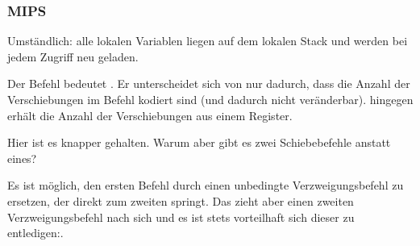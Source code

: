 \subsubsection{MIPS}




Umständlich: alle lokalen Variablen liegen auf dem lokalen Stack und werden bei
jedem Zugriff neu geladen.

Der Befehl \SLLV bedeutet . Er unterscheidet
sich von \SLL nur dadurch, dass die Anzahl der Verschiebungen im \SLL Befehl
kodiert sind (und dadurch nicht veränderbar). \SLLV hingegen erhält die Anzahl
der Verschiebungen aus einem Register.

Hier ist es knapper gehalten.
Warum aber gibt es zwei Schiebebefehle anstatt eines?

Es ist möglich, den ersten \SLLV Befehl durch einen unbedingte
Verzweigungsbefehl zu ersetzen, der direkt zum zweiten \SLLV springt. 
Das zieht aber einen zweiten Verzweigungsbefehl nach sich und es ist stets
vorteilhaft sich dieser zu entledigen:.



